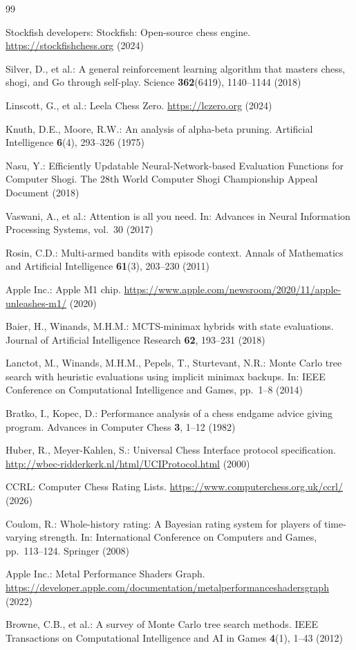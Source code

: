 \documentclass{svproc}
\begin{document}
\begin{thebibliography}{99}

Stockfish developers: Stockfish: Open-source chess engine. \url{https://stockfishchess.org} (2024)

Silver, D., et al.: A general reinforcement learning algorithm that masters chess, shogi, and Go through self-play. Science \textbf{362}(6419), 1140--1144 (2018)

Linscott, G., et al.: Leela Chess Zero. \url{https://lczero.org} (2024)

Knuth, D.E., Moore, R.W.: An analysis of alpha-beta pruning. Artificial Intelligence \textbf{6}(4), 293--326 (1975)

Nasu, Y.: Efficiently Updatable Neural-Network-based Evaluation Functions for Computer Shogi. The 28th World Computer Shogi Championship Appeal Document (2018)

Vaswani, A., et al.: Attention is all you need. In: Advances in Neural Information Processing Systems, vol.~30 (2017)

Rosin, C.D.: Multi-armed bandits with episode context. Annals of Mathematics and Artificial Intelligence \textbf{61}(3), 203--230 (2011)

Apple Inc.: Apple M1 chip. \url{https://www.apple.com/newsroom/2020/11/apple-unleashes-m1/} (2020)

Baier, H., Winands, M.H.M.: MCTS-minimax hybrids with state evaluations. Journal of Artificial Intelligence Research \textbf{62}, 193--231 (2018)

Lanctot, M., Winands, M.H.M., Pepels, T., Sturtevant, N.R.: Monte Carlo tree search with heuristic evaluations using implicit minimax backups. In: IEEE Conference on Computational Intelligence and Games, pp.~1--8 (2014)

Bratko, I., Kopec, D.: Performance analysis of a chess endgame advice giving program. Advances in Computer Chess \textbf{3}, 1--12 (1982)

Huber, R., Meyer-Kahlen, S.: Universal Chess Interface protocol specification. \url{http://wbec-ridderkerk.nl/html/UCIProtocol.html} (2000)

CCRL: Computer Chess Rating Lists. \url{https://www.computerchess.org.uk/ccrl/} (2026)

Coulom, R.: Whole-history rating: A Bayesian rating system for players of time-varying strength. In: International Conference on Computers and Games, pp.~113--124. Springer (2008)

Apple Inc.: Metal Performance Shaders Graph. \url{https://developer.apple.com/documentation/metalperformanceshadersgraph} (2022)

Browne, C.B., et al.: A survey of Monte Carlo tree search methods. IEEE Transactions on Computational Intelligence and AI in Games \textbf{4}(1), 1--43 (2012)

\end{thebibliography}
\end{document}
